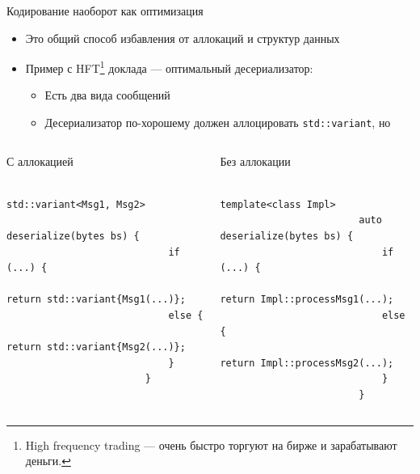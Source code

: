     \begin{frame}[fragile]{Кодирование наоборот как оптимизация \popslide}
        \begin{itemize}
            \item Это общий способ избавления от аллокаций и структур данных
            \item Пример с HFT\footnote{High frequency trading --- очень быстро торгуют на бирже и зарабатывают деньги.} доклада --- оптимальный десериализатор:
            \begin{itemize}
                \item Есть два вида сообщений
                \item Десериализатор по-хорошему должен аллоцировать \texttt{std::variant}, но
            \end{itemize}
        \end{itemize}
        \begin{columns}[onlytextwidth]
            \begin{column}{0.485\textwidth}
                \begin{block}{С аллокацией}
                    \begin{verbatim}
                        std::variant<Msg1, Msg2>
                            deserialize(bytes bs) {
                            if (...) {
                                return std::variant{Msg1(...)};
                            else {
                                return std::variant{Msg2(...)};
                            }
                        }
                    \end{verbatim}
                \end{block}
            \end{column}\hfill%
            \begin{column}{0.485\textwidth}
                \begin{block}{Без аллокации}
                    \begin{verbatim}
                        template<class Impl>
                        auto deserialize(bytes bs) {
                            if (...) {
                                return Impl::processMsg1(...);
                            else {
                                return Impl::processMsg2(...);
                            }
                        }
                    \end{verbatim}
                \end{block}
            \end{column}
        \end{columns}
    \end{frame}

